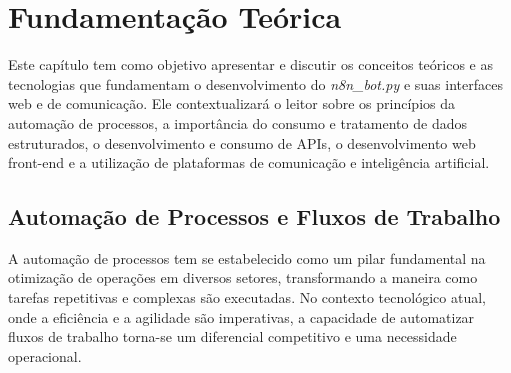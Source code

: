 \pagestyle{myheadings}
\newpage

\chapter{Fundamentação Teórica}
\thispagestyle{myheadings}

Este capítulo tem como objetivo apresentar e discutir os conceitos teóricos e as tecnologias que fundamentam o desenvolvimento do \textit{n8n\_bot.py} e suas interfaces web e de comunicação. Ele contextualizará o leitor sobre os princípios da automação de processos, a importância do consumo e tratamento de dados estruturados, o desenvolvimento e consumo de APIs, o desenvolvimento web front-end e a utilização de plataformas de comunicação e inteligência artificial.

\section{Automação de Processos e Fluxos de Trabalho}
A automação de processos tem se estabelecido como um pilar fundamental na otimização de operações em diversos setores, transformando a maneira como tarefas repetitivas e complexas são executadas. No contexto tecnológico atual, onde a eficiência e a agilidade são imperativas, a capacidade de automatizar fluxos de trabalho torna-se um diferencial competitivo e uma necessidade operacional.

